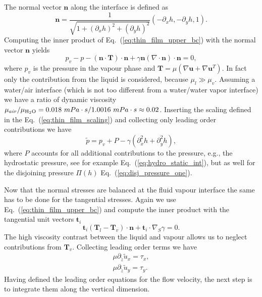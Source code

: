 The normal vector $\mathbf{n}$ along the interface is defined as 
\begin{equation}\label{eq:normal_vec_thin_film}
    \mathbf{n} = \frac{1}{\sqrt{1 + (\partial_x h)^2 + (\partial_y h)^2}}(-\partial_x h, -\partial_y h, 1).
\end{equation}
Computing the inner product of Eq.~(\ref{eq:thin_film_upper_bc}) with the normal vector $\mathbf{n}$ yields
\begin{equation}\label{eq:balance_stresses_normal}
    p_v - p -(\mathbf{n}\cdot\mathbf{T})\cdot\mathbf{n} + \gamma\mathbf{n}(\nabla\cdot\mathbf{n})\cdot\mathbf{n} = 0,
\end{equation}
where $p_v$ is the pressure in the vapour phase and $\mathbf{T} = \mu(\nabla\mathbf{u} + \nabla\mathbf{u}^T)$.
In fact only the contribution from the liquid is considered, because $\mu_l \gg \mu_v$.
Assuming a water/air interface (which is not too different from a water/water vapor interface) we have a ratio of dynamic viscosity $\mu_{air} / \mu_{\ce{H2O}} = 0.018~mPa\cdot s/ 1.0016~mPa\cdot s \approx 0.02$.
Inserting the scaling defined in the Eq.~(\ref{eq:thin_film_scaling}) and collecting only leading order contributions we have 
\begin{equation}
    \tilde{p} = p_v + P - \gamma(\partial_{\tilde{x}}^2 h + \partial_{\tilde{y}}^2 h),
\end{equation}
where $P$ accounts for all additional contributions to the pressure, e.g., the hydrostatic pressure, see for example Eq.~(\ref{eq:hydro_static_int}), but as well for the disjoining pressure $\Pi(h)$ Eq.~(\ref{eq:disj_pressure_one}).

Now that the normal stresses are balanced at the fluid vapour interface the same has to be done for the tangential stresses.
Again we use Eq.~(\ref{eq:thin_film_upper_bc}) and compute the inner product with the tangential unit vectors $\mathbf{t}_i$ 
\begin{equation}\label{eq:upper_bc_tangential}
    \mathbf{t}_i(\mathbf{T}_l - \mathbf{T}_v)\cdot\mathbf{n} + \mathbf{t}_i\cdot\nabla_S\gamma = 0.
\end{equation}
The high viscosity contrast between the liquid and vapour allows us to neglect contributions from $\mathbf{T}_v$.
Collecting leading order terms we have
\begin{align}
    \mu\partial_{\tilde{z}}\tilde{u}_x = \tau_x, \label{eq:tau_x_thin}\\
    \mu\partial_{\tilde{z}}\tilde{u}_y = \tau_y. \label{eq:tau_y_thin}
\end{align}
Having defined the leading order equations for the flow velocity, the next step is to integrate them along the vertical dimension.

